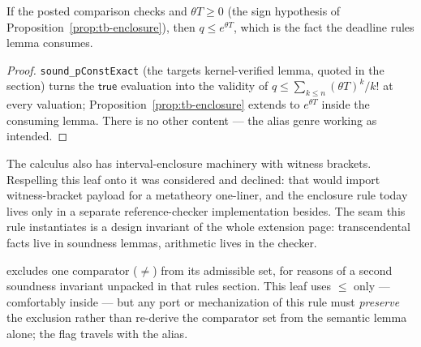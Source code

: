 \begin{bprop}\label{prop:tb-sound}
If the posted comparison checks and $\theta T \ge 0$ (the sign
hypothesis of Proposition~\ref{prop:tb-enclosure}), then
$q \le e^{\theta T}$, which is the fact the deadline
rule\textquotesingle s lemma consumes.
\end{bprop}
\begin{proof}
\texttt{sound\_pConstExact} (the target\textquotesingle s
kernel-verified lemma, quoted in the  section)
turns the $\mathsf{true}$ evaluation into the validity of
$q \le \sum_{k \le n} (\theta T)^k/k!$ at every valuation;
Proposition~\ref{prop:tb-enclosure} extends to $e^{\theta T}$ inside
the consuming lemma. There is no other content --- the alias genre
working as intended.
\end{proof}


\begin{bremark}
The calculus also has interval-enclosure machinery with witness
brackets. Respelling this leaf onto it was considered and declined:
that would import witness-bracket payload for a metatheory one-liner,
and the enclosure rule today lives only in a separate
reference-checker implementation besides. The seam this rule
instantiates is a design invariant of the whole extension page:
transcendental facts live in soundness lemmas, arithmetic lives in the
checker.
\end{bremark}

\begin{bremark}
 excludes one comparator ($\neq$) from its
admissible set, for reasons of a second soundness invariant unpacked in
that rule\textquotesingle s section. This leaf uses $\le$ only ---
comfortably inside --- but any port or mechanization of this rule must
\emph{preserve} the exclusion rather than re-derive the comparator set
from the semantic lemma alone; the flag travels with the alias.
\end{bremark}

